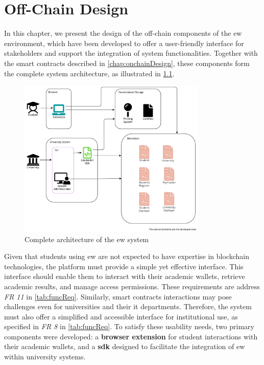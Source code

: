 \chapter{Off-Chain Design}
\label{chap:offchainDesign}
In this chapter, we present the design of the off-chain components of the \acrlong{ew} environment, which have been developed to offer a user-friendly interface for stakeholders and support the integration of system functionalities. Together with the smart contracts described in \cref{chap:onchainDesign}, these components form the complete system architecture, as illustrated in \cref{fig:fullArchDiag}. 

\begin{figure}[htpb]
  \centering
  \includegraphics[width=0.8\textwidth]{figures/Architecture diagram complete.pdf}
  \caption[System architecture diagram]{Complete architecture of the \acrlong{ew} system}
  \label{fig:fullArchDiag}
\end{figure}

Given that students using \acrshort{ew} are not expected to have expertise in blockchain technologies, the platform must provide a simple yet effective interface. This interface should enable them to interact with their academic wallets, retrieve academic results, and manage access permissions. These requirements are address \textit{FR 11} in \cref{tab:funcReq}. Similarly, smart contracts interactions may pose challenges even for universities and their \acrfull{it} departments. Therefore, the system must also offer a simplified and accessible interface for institutional use, as specified in \textit{FR 8} in \cref{tab:funcReq}. 
To satisfy these usability needs, two primary components were developed: a \textbf{browser extension} for student interactions with their academic wallets, and a \textbf{\acrlong{sdk}} designed to facilitate the integration of \acrshort{ew} within university systems.

